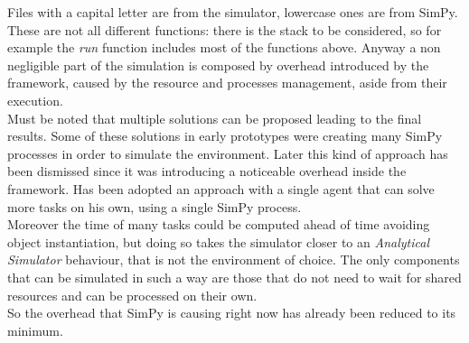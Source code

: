 Files with a capital letter are from the simulator, lowercase ones are from
SimPy. These are not all different functions: there is the stack to be
considered, so for example the \textit{run} function includes most of the functions above.
Anyway a non negligible part of the simulation is composed by overhead
introduced by the framework, caused by the resource  and processes management,
aside from their execution. \\
Must be noted that multiple solutions can be proposed leading to the final
results. Some of these solutions in early prototypes were creating many SimPy
processes in order to simulate the environment.  Later this kind of approach has
been dismissed since it was introducing a noticeable overhead inside the
framework. Has been adopted an approach with a single agent that can solve more
tasks on his own, using a single SimPy process.  \\
Moreover the time of many tasks could be computed ahead of time avoiding object
instantiation, but doing so takes the simulator closer to an \textit{Analytical
Simulator} behaviour, that is not the environment of choice. The only components
that can be simulated in such a way are those that do not need to wait for
shared resources and can be processed on their own. \\
So the overhead that SimPy is causing right now has already been reduced to its
minimum.
